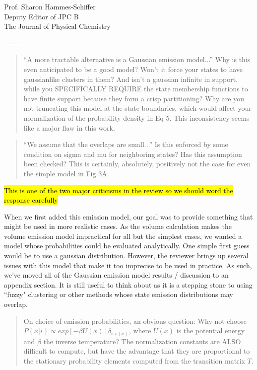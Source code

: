 \documentclass{letter}
\newcommand{\separate}{\begin{center}--------\end{center}}
\begin{document}
\begin{letter}{Prof. Sharon Hammes-Schiffer \\ Deputy Editor of JPC B \\ The Journal of Physical Chemistry}
\separate
\begin{quote}
``A more tractable alternative is a Gaussian emission model...''  Why is this even anticipated to be a good model?  Won't it force your states to have gaussianlike clusters in them?  And isn't a gaussian infinite in support, while you SPECIFICALLY REQUIRE the state membership functions to have finite support because they form a crisp partitioning?  Why are you not truncating this model at the state boundaries, which would affect your normalization of the probability density in Eq 5.  This inconsistency seems like a major flaw in this work.
\end{quote}

\begin{quote}
``We assume that the overlaps are small...''  Is this enforced by some condition on sigma and mu for neighboring states?  Has this assumption been checked?  This is certainly, absolutely, positively not the case for even the simple model in Fig 3A.
\end{quote}

\hl{This is one of the two major criticisms in the review so we should word the response carefully}

When we first added this emission model, our goal was to provide something that might be used in more realistic cases. As the volume calculation makes the volume emission model impractical for all but the simplest cases, we wanted a model whose probabilities could be evaluated analytically. One simple first guess would be to use a gaussian distribution. However, the reviewer brings up several issues with this model that make it too imprecise to be used in practice. As such, we've moved all of the Gaussian emission model results / discussion to an appendix section. It is still useful to think about as it is a stepping stone to using ``fuzzy" clustering or other methods whose state emission distributions may overlap.

\begin{quote}
On choice of emission probabilities, an obvious question: Why not choose $P(x|i) \propto exp[-\beta U(x)] \delta_{i,s(x)}$, where $U(x)$ is the potential energy and $\beta$ the inverse temperature?  The normalization constants are ALSO difficult to compute, but have the advantage that they are proportional to the stationary probability elements computed from the transition matrix $T$.
\end{quote}


\end{letter}
\end{document}
